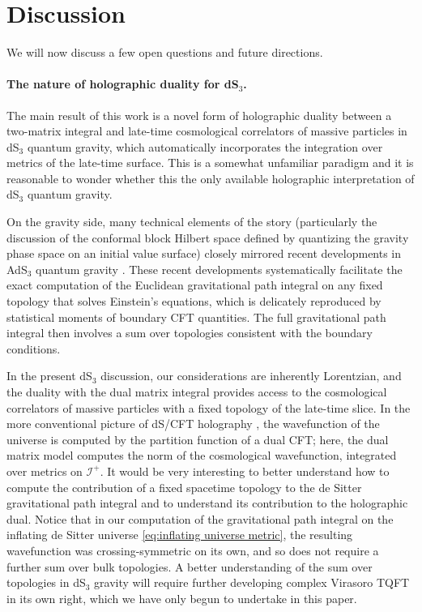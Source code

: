 \documentclass[12pt,a4paper]{article}
\begin{document}
\section{Discussion} \label{sec:discussion}
We will now discuss a few open questions and future directions.

\paragraph{The nature of holographic duality for dS$_3$.}
The main result of this work is a novel form of  holographic duality between a two-matrix integral and late-time cosmological correlators of massive particles in dS$_3$ quantum gravity, which automatically incorporates the integration over metrics of the late-time surface. This is a somewhat unfamiliar paradigm and it is reasonable to wonder whether this the only available holographic interpretation of dS$_3$ quantum gravity. 

On the gravity side, many technical elements of the story (particularly the discussion of the conformal block Hilbert space defined by quantizing the gravity phase space on an initial value surface) closely mirrored recent developments in AdS$_3$ quantum gravity \cite{Collier:2023fwi,Collier:2024mgv}. 
These recent developments systematically facilitate the exact computation of the Euclidean gravitational path integral on any fixed topology that solves Einstein's equations, which is delicately reproduced by statistical moments of boundary CFT quantities.
The full gravitational path integral then involves a sum over topologies consistent with the boundary conditions.  

In the present dS$_3$ discussion, our considerations are inherently Lorentzian, and the duality with the dual matrix integral provides access to the cosmological correlators of massive particles with a fixed topology of the late-time slice. In the more conventional picture of dS/CFT holography \cite{Strominger:2001pn}, the wavefunction of the universe is computed by the partition function of a dual CFT; here, the dual matrix model computes the norm of the cosmological wavefunction, integrated over metrics on $\mathcal{I}^+$.
It would be very interesting to better understand how to compute the contribution of a fixed spacetime topology to the de Sitter gravitational path integral and to understand its contribution to the holographic dual. Notice that in our computation of the gravitational path integral on the inflating de Sitter universe \eqref{eq:inflating universe metric}, the resulting wavefunction was crossing-symmetric on its own, and so does not require a further sum over bulk topologies. A better understanding of the sum over topologies in dS$_3$ gravity will require further developing complex Virasoro TQFT in its own right, which we have only begun to undertake in this paper.
\end{document}
